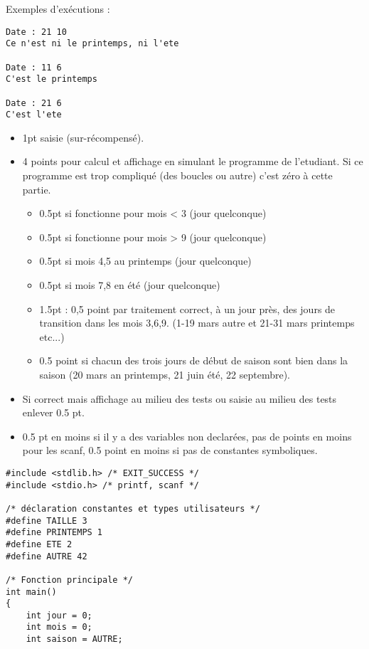 Exemples d'exécutions :
\begin{small}
\begin{verbatim}
Date : 21 10
Ce n'est ni le printemps, ni l'ete

Date : 11 6
C'est le printemps

Date : 21 6
C'est l'ete
\end{verbatim}
\end{small}
  \begin{correction}
   \begin{itemize}
    \item 1pt saisie (sur-récompensé).
    \item 4 points pour calcul et affichage en simulant le programme de l'etudiant. Si ce
      programme est trop compliqué (des boucles ou autre) c'est zéro à
      cette partie.
      \begin{itemize}
      \item 0.5pt si fonctionne pour mois < 3  (jour quelconque)
        \item 0.5pt si fonctionne pour mois > 9  (jour quelconque)
      \item 0.5pt si mois 4,5 au printemps  (jour quelconque)
      \item 0.5pt si mois 7,8 en été  (jour quelconque)
        \item 1.5pt : 0,5 point par traitement correct, à un jour près, des
          jours de transition dans les mois 3,6,9.  (1-19 mars autre et 21-31
          mars printemps etc...)
\item 0.5 point si chacun des trois jours de début de saison sont bien
  dans la saison (20 mars an printemps, 21 juin été, 22 septembre).
      \end{itemize}
    \item Si correct mais affichage au milieu des tests ou saisie au
      milieu des tests enlever 0.5 pt.
      \item 0.5 pt en moins si il y a des variables non declarées, pas
        de points en moins pour les scanf, 0.5 point en moins si pas
        de constantes symboliques.
    \end{itemize}
\begin{small}
\begin{verbatim}
#include <stdlib.h> /* EXIT_SUCCESS */
#include <stdio.h> /* printf, scanf */

/* déclaration constantes et types utilisateurs */
#define TAILLE 3
#define PRINTEMPS 1
#define ETE 2
#define AUTRE 42

/* Fonction principale */
int main()
{
    int jour = 0;
    int mois = 0;
    int saison = AUTRE;
    

\end{verbatim}
\end{small}
\end{correction}
